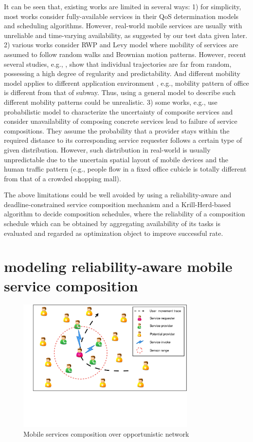 \documentclass[journal]{IEEEtran}
\begin{document}
It can be seen that, existing works are limited in several ways: 
1) for simplicity, most works consider fully-available services in their QoS determination models and scheduling algorithms. However, real-world mobile services are usually with unreliable and time-varying availability, as suggested by our test data given later.
2) various works consider RWP and Levy model where mobility of services are assumed to follow random walks and Brownian motion patterns. However, recent several studies, e.g., \cite{barbosa2017human, bettstetter2003node, navidi2004improving}, show that individual trajectories are far from random, possessing a high degree of regularity and predictability. And different mobility model applies to different application environment \cite{camp2002survey}, e.g., mobility pattern of office is different from that of subway. Thus, using a general model to describe such different mobility patterns could be unrealistic.
3) some works, e.g., \cite{wang2011exploiting, Deng2016-2} use probabilistic model to characterize the uncertainty of composite services and consider unavailability of composing concrete services lead to failure of service compositions.
They assume the probability that a provider stays within the required distance to its corresponding service requester follows a certain type of given distribution. However, such distribution in real-world is usually unpredictable due to the uncertain spatial layout of mobile devices and the human traffic pattern (e.g., people flow in a fixed office cubicle is totally different from that of a crowded shopping mall). 

The above limitations could be well avoided by using a reliability-aware and deadline-constrained service composition mechanism and a Krill-Herd-based algorithm to decide composition schedules, where the reliability of a composition schedule which can be obtained by aggregating availability of its tasks is evaluated and regarded as optimization object to improve successful rate.

\section{modeling reliability-aware mobile service composition}
\begin{figure}[!t]
\centering
\includegraphics[width=3.5in]{./img/pic2.pdf}
\caption{Mobile services composition over opportunistic network}
\label{fig_MSCON}
\end{figure}
\end{document}
